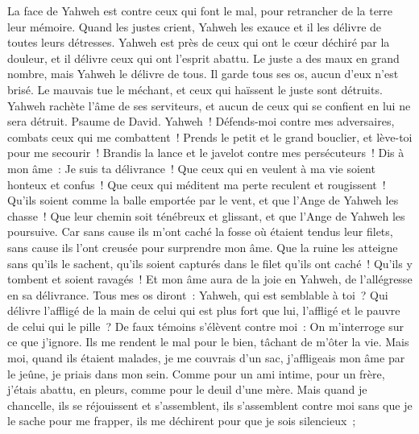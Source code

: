 \begin{multicols}{2}
 La face de Yahweh est contre ceux qui font le mal, pour retrancher de la terre leur mémoire.
 Quand les justes crient, Yahweh les exauce et il les délivre de toutes leurs détresses.
 Yahweh est près de ceux qui ont le cœur déchiré par la douleur, et il délivre ceux qui ont l'esprit abattu.
 Le juste a des maux en grand nombre, mais Yahweh le délivre de tous.
 Il garde tous ses os, aucun d'eux n'est brisé.
 Le mauvais tue le méchant, et ceux qui haïssent le juste sont détruits.
 Yahweh rachète l'âme de ses serviteurs, et aucun de ceux qui se confient en lui ne sera détruit.
\VerseOne{}Psaume de David. Yahweh~! Défends-moi contre mes adversaires, combats ceux qui me combattent~!
Prends le petit et le grand bouclier, et lève-toi pour me secourir~!
Brandis la lance et le javelot contre mes persécuteurs~! Dis à mon âme~: Je suis ta délivrance~!
Que ceux qui en veulent à ma vie soient honteux et confus~! Que ceux qui méditent ma perte reculent et rougissent~!
Qu'ils soient comme la balle emportée par le vent, et que l'Ange de Yahweh les chasse~!
Que leur chemin soit ténébreux et glissant, et que l'Ange de Yahweh les poursuive.
Car sans cause ils m'ont caché la fosse où étaient tendus leur filets, sans cause ils l'ont creusée pour  surprendre mon âme.
Que la ruine les atteigne sans qu'ils le sachent, qu'ils soient capturés dans le filet qu'ils ont caché~! Qu'ils y tombent et soient ravagés~!
Et mon âme aura de la joie en Yahweh, de l'allégresse en sa délivrance.
Tous mes os diront~: Yahweh, qui est semblable à toi~? Qui délivre l'affligé de la main de celui qui est plus fort que lui, l'affligé et le pauvre de celui qui le pille~?
De faux témoins s'élèvent contre moi~: On m'interroge sur ce que j'ignore.
Ils me rendent le mal pour le bien, tâchant de m'ôter la vie.
Mais moi, quand ils étaient malades, je me couvrais d'un sac, j'affligeais mon âme par le jeûne, je priais dans mon sein.
Comme pour un ami intime, pour un frère, j'étais abattu, en pleurs, comme pour le deuil d'une mère.
Mais quand je chancelle, ils se réjouissent et s'assemblent, ils s'assemblent contre moi sans que je le sache pour me frapper, ils me déchirent pour que je sois silencieux~;

\end{multicols}
